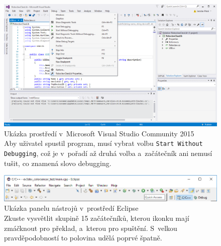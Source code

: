 \begin{figure}[h]
    \centering
    \includegraphics[width=\textwidth]{images/visual-studio_debug.png}
    \caption[Ukázka prostředí v~Microsoft Visual Studio Community 2015]{Ukázka prostředí v~Microsoft Visual Studio Community 2015 \\
    Aby uživatel spustil program, musí vybrat volbu \texttt{Start Without Debugging}, což je v~pořadí až druhá volba a~začátečník ani nemusí tušit, co znamená slovo debugging. 
% 
% 
% 
% 
    }
    \label{fig:visual-studio-community-2015}
\end{figure}

\begin{figure}[h]
    \centering
    \includegraphics[width=\textwidth]{images/eclipse_tools-panel_focus.png}
    \caption[Ukázka panelu nástrojů v~prostředí Eclipse]{Ukázka panelu nástrojů v~prostředí Eclipse \\
    Zkuste vysvětlit skupině 15 začátečníků, kterou ikonku mají zmáčknout pro překlad, a~kterou pro spuštění. S~velkou pravděpodobností to polovina udělá poprvé špatně.  
% 
% 
    }
    \label{fig:eclipse_tools-panel}
\end{figure}

